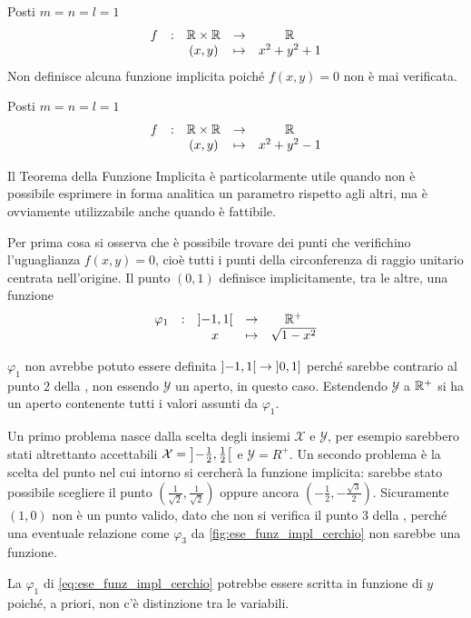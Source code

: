 \begin{example}
	Posti $m = n = l = 1$
	\[\begin{array}{ccccc} {f} & : & {\mathbb{R} \times \mathbb{R}} & \to & {\mathbb{R}} \\ & & {(x,y)} & \mapsto & {x^2 + y^2 + 1} \\ \end{array}\]
	Non definisce alcuna funzione implicita poiché $f(x,y) = 0$ non è mai verificata.
\end{example}
\begin{example}
	Posti $m = n = l = 1$
	\[\begin{array}{ccccc} {f} & : & {\mathbb{R} \times \mathbb{R}} & \to & {\mathbb{R}} \\ & & {(x,y)} & \mapsto & {x^2 + y^2 - 1} \\ \end{array}\]
	\begin{note}
		Il Teorema della Funzione Implicita è particolarmente utile quando non è possibile esprimere in forma analitica un parametro rispetto agli altri, ma è ovviamente utilizzabile anche quando è fattibile.
	\end{note}
	Per prima cosa si osserva che è possibile trovare dei punti che verifichino l'uguaglianza $f(x,y) = 0$, cioè tutti i punti della circonferenza di raggio unitario centrata nell'origine. Il punto $(0,1)$ definisce implicitamente, tra le altre, una funzione
	\begin{equation}
		\label{eq:ese_funz_impl_cerchio}
		\begin{array}{ccccc} {\varphi_1} & : & {\left]-1,1\right[} & \to & {\mathbb{R}^+} \\ & & {x} & \mapsto & {\sqrt{1-x^2}} \\ \end{array}
	\end{equation}
	\begin{note}
		$\varphi_1$ non avrebbe potuto essere definita $\left]-1,1\right[ \to \left]0,1\right]$ perché sarebbe contrario al punto 2 della , non essendo $\mathcal{Y}$ un aperto, in questo caso. Estendendo $\mathcal{Y}$ a $\mathbb{R}^+$ si ha un aperto contenente tutti i valori assunti da $\varphi_1$.
	\end{note}
	Un primo problema nasce dalla scelta degli insiemi $\mathcal{X}$ e $\mathcal{Y}$, per esempio sarebbero stati altrettanto accettabili $\mathcal{X} = \left]-\frac{1}{2},\frac{1}{2}\right[$ e $\mathcal{Y} = R^+ $. Un secondo problema è la scelta del punto nel cui intorno si cercherà la funzione implicita: sarebbe stato possibile scegliere il punto $(\frac{1}{\sqrt{2}},\frac{1}{\sqrt{2}})$ oppure ancora $(-\frac{1}{2},-\frac{\sqrt{3}}{2})$. Sicuramente $(1,0)$ non è un punto valido, dato che non si verifica il punto 3 della , perché una eventuale relazione come $\varphi_3$ da \autoref{fig:ese_funz_impl_cerchio} non sarebbe una funzione.
	\begin{note}
		La $\varphi_1$ di \cref{eq:ese_funz_impl_cerchio} potrebbe essere scritta in funzione di $y$ poiché, a priori, non c'è distinzione tra le variabili.
	\end{note}
	~
	\begin{figure}[H]

\end{figure}
\end{example}
